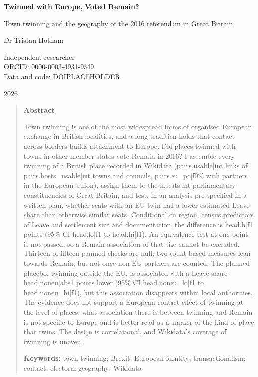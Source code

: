\documentclass[11pt,a4paper]{article}
\begin{document}
\begin{center}
{\Large\bfseries Twinned with Europe, Voted Remain?\par}
\vspace{0.4em}
{\large Town twinning and the geography of the 2016 referendum in Great Britain\par}
\vspace{1.2em}
{\large Dr Tristan Hotham\par}
\vspace{0.3em}
{\small Independent researcher\\
ORCID: 0000-0003-4931-9349\\
Data and code: DOIPLACEHOLDER\par}
\vspace{0.8em}
2026
\end{center}

\begin{quote}
\small
\begin{center}\textbf{Abstract}\end{center}
Town twinning is one of the most widespread forms of organised European exchange in British localities, and a long tradition holds that contact across borders builds attachment to Europe. Did places twinned with towns in other member states vote Remain in 2016? I assemble every twinning of a British place recorded in Wikidata ({{pairs.usable|int}} links of {{pairs.hosts_usable|int}} towns and councils, {{pairs.eu_pc|f0}}\% with partners in the European Union), assign them to the {{n.seats|int}} parliamentary constituencies of Great Britain, and test, in an analysis pre-specified in a written plan, whether seats with an EU twin had a lower estimated Leave share than otherwise similar seats. Conditional on region, census predictors of Leave and settlement size and documentation, the difference is {{head.b|f1}} points (95\% CI {{head.lo|f1}} to {{head.hi|f1}}). An equivalence test at one point is not passed, so a Remain association of that size cannot be excluded. Thirteen of fifteen planned checks are null; two count-based measures lean towards Remain, but not once non-EU partners are counted. The planned placebo, twinning outside the EU, is associated with a Leave share {{head.noneu|abs1}} points lower (95\% CI {{head.noneu_lo|f1}} to {{head.noneu_hi|f1}}), but this association disappears within local authorities. The evidence does not support a European contact effect of twinning at the level of places: what association there is between twinning and Remain is not specific to Europe and is better read as a marker of the kind of place that twins. The design is correlational, and Wikidata's coverage of twinning is uneven.

\textbf{Keywords:} town twinning; Brexit; European identity; transactionalism; contact; electoral geography; Wikidata
\end{quote}
\end{document}
